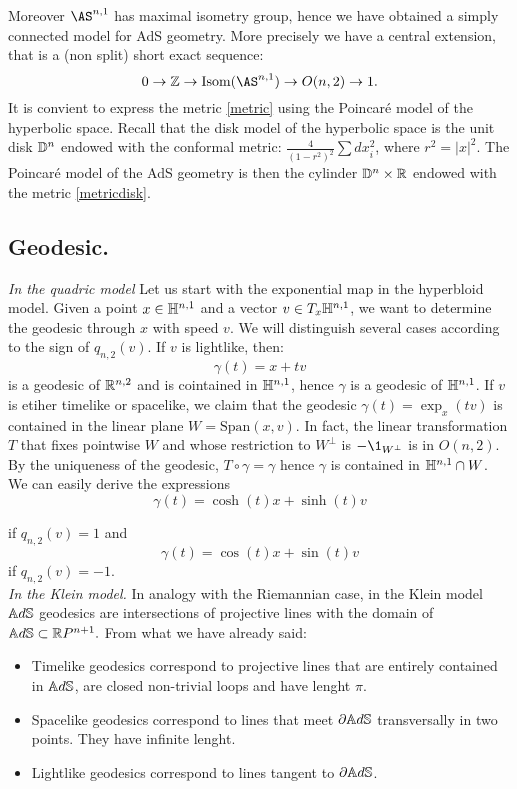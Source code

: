 Moreover $\AS^{n,1}$ has maximal isometry group, hence we have obtained a simply connected model for AdS geometry. More precisely we have a central extension, that is a (non split) short exact sequence:
\[
    0\to \Z\to \textnormal{Isom}(\AS^{n,1})\to O(n,2)\to 1.
\]
It is convient to express the metric \ref{metric} using the Poincaré model of the hyperbolic space. Recall that the disk model of the hyperbolic space is the unit disk $\mathbb{D}^n$ endowed with the conformal metric: $\frac{4}{(1-r^2)^2}\sum dx_i^2$, where $r^2=\vert x\vert^2$. 
The Poincaré model of the AdS geometry is then the cylinder $\mathbb{D}^n\times \mathbb{R}$ endowed with the metric \ref{metricdisk}.\\
\subsection{Geodesic.}

\textit{In the quadric model} Let us start with the exponential map in the hyperbloid model. Given a point $x\in \mathbb{H}^{n,1}$ and a vector $v\in T_x\mathbb{H}^{n,1}$, we want to determine the geodesic through $x$ with speed $v$. We will distinguish several cases according to the sign of $ q_{n,2}(v)$. If $v$ is lightlike, then: 
\[
    \gamma(t)=x+tv
\] is a geodesic of $\mathbb{R}^{n,2}$ and is cointained in $\mathbb{H}^{n,1}$, hence $\gamma$ is a geodesic of $\mathbb{H}^{n,1}$. If $v$ is etiher timelike or spacelike, we claim that the geodesic $\gamma(t)=\exp_x(tv)$ is contained in the linear plane $W=\text{Span}(x,v).$ In fact, the linear transformation $T$ that fixes pointwise $W$ and whose restriction to $W^\perp$ is $-\1_{W^\perp}$ is in $O(n,2)$. By the uniqueness of the geodesic, $T\circ\gamma=\gamma$ hence $\gamma$ is contained in $\mathbb{H}^{n,1}\cap W$. We can easily derive the expressions\\
\begin{equation}
    \gamma(t)=\cosh(t)x+\sinh(t)v
\end{equation}

if $q_{n,2}(v)=1$ and 
\[
    \gamma(t)=\cos(t)x+\sin(t)v
\]
if $q_{n,2}(v)=-1$.\\

\textit{In the Klein model.} In analogy with the Riemannian case, in the Klein model $\mathbb{A}d\mathbb{S}$ geodesics are intersections of projective lines with the domain of $\mathbb{A}d\mathbb{S}\subset\mathbb{R} P^{n+1}.$ From what we have already said: 
\begin{itemize}
    \item Timelike geodesics correspond to projective lines that are entirely contained in $\mathbb{A}d\mathbb{S}$, are closed non-trivial loops and have lenght $\pi.$ 
    \item Spacelike geodesics correspond to lines that meet $\partial \mathbb{A}d\mathbb{S}$ transversally in two points. They have infinite lenght.
    \item Lightlike geodesics correspond to lines tangent to $\partial\mathbb{A}d\mathbb{S}$.   
\end{itemize}

